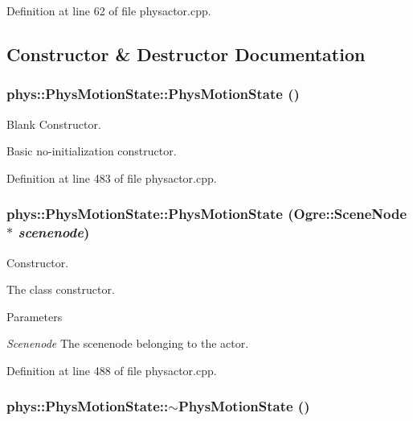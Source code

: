 Definition at line 62 of file physactor.cpp.



\subsection{Constructor \& Destructor Documentation}
\hypertarget{classphys_1_1PhysMotionState_ac685ae94d7ee7740aaee8c1a1132b27a}{
\subsubsection[{PhysMotionState}]{\setlength{\rightskip}{0pt plus 5cm}phys::PhysMotionState::PhysMotionState ()}}
\label{dc/d0d/classphys_1_1PhysMotionState_ac685ae94d7ee7740aaee8c1a1132b27a}


Blank Constructor. 

Basic no-\/initialization constructor. 

Definition at line 483 of file physactor.cpp.

\hypertarget{classphys_1_1PhysMotionState_a505aa5ea3bbaba4710924f030f4ed008}{
\subsubsection[{PhysMotionState}]{\setlength{\rightskip}{0pt plus 5cm}phys::PhysMotionState::PhysMotionState (Ogre::SceneNode $\ast$ {\em scenenode})}}
\label{dc/d0d/classphys_1_1PhysMotionState_a505aa5ea3bbaba4710924f030f4ed008}


Constructor. 

The class constructor. 
\begin{DoxyParams}{Parameters}
\item[{\em Scenenode}]The scenenode belonging to the actor. \end{DoxyParams}


Definition at line 488 of file physactor.cpp.

\hypertarget{classphys_1_1PhysMotionState_a20798e3dce2d71a938c3607a8610eaac}{
\subsubsection[{$\sim$PhysMotionState}]{\setlength{\rightskip}{0pt plus 5cm}phys::PhysMotionState::$\sim$PhysMotionState ()}}
\label{dc/d0d/classphys_1_1PhysMotionState_a20798e3dce2d71a938c3607a8610eaac}


